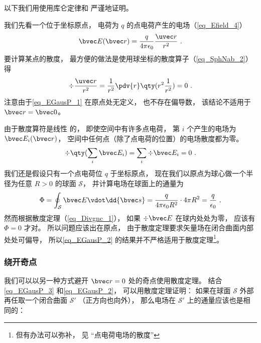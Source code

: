 

以下我们用使用库仑定律和 严谨地证明。

我们先看一个位于坐标原点， 电荷为 $q$ 的点电荷产生的电场（\autoref{eq_Efield_4}）
\begin{equation}\label{eq_EGausP_1}
\bvec E(\bvec r) = \frac{q}{4\pi\epsilon_0}\frac{\uvec r}{r^2}~.
\end{equation}
要计算某点的散度， 最方便的做法是使用球坐标的散度算子（\autoref{eq_SphNab_2}）得
\begin{equation}
\div \frac{\uvec r}{r^2} = \frac{1}{r^2} \pdv{r} \qty(r^2 \frac{1}{r^2}) = 0~.
\end{equation}
注意由于\autoref{eq_EGausP_1} 在原点处无定义， 也不存在偏导数， 该结论不适用于 $\bvec r = \bvec 0$。

由于散度算符是线性%
的， 即使空间中有许多点电荷， 第 $i$ 个产生的电场为 $\bvec E_i(\bvec r)$， 空间中任何点（除了点电荷的位置）的电场散度都为零。
\begin{equation}\label{eq_EGausP_3}
\div \qty(\sum_i \bvec E_i) = \sum_i \div \bvec E_i = 0~.
\end{equation}
我们还是假设只有一个点电荷位 $q$ 于坐标原点， 现在我们以原点为球心做一个半径为任意 $R > 0$ 的球面 $\mathcal S$， 并计算电场在球面上的通量为
\begin{equation}\label{eq_EGausP_2}
\Phi = \oint_{\mathcal S} \bvec E \vdot \dd{\bvec s} = \frac{q}{4\pi\epsilon_0 R^2} \cdot 4\pi R^2 = \frac{q}{\epsilon_0}~.
\end{equation}
然而根据散度定理（\autoref{eq_Divgnc_1}）， 如果 $\div \bvec E$ 在球内处处为零， 应该有 $\Phi = 0$ 才对。 所以问题应该出在原点， 由于散度定理要求矢量场在闭合曲面内部处处可偏导， %
 所以\autoref{eq_EGausP_2} 的结果并不严格适用于散度定理\footnote{但有办法可以弥补， 见 “点电荷电场的散度”}。 %

\subsubsection{绕开奇点}
我们可以以另一种方式避开 $\bvec r = 0$ 处的奇点使用散度定理。 结合\autoref{eq_EGausP_3} 和\autoref{eq_EGausP_2}， 可以用散度定理证明： 如果在球面 $\mathcal S$ 外部再任取一个闭合曲面 $\mathcal S'$ （正方向也向外）， 那么电场在 $\mathcal S'$ 上的通量应该也是相同的：

